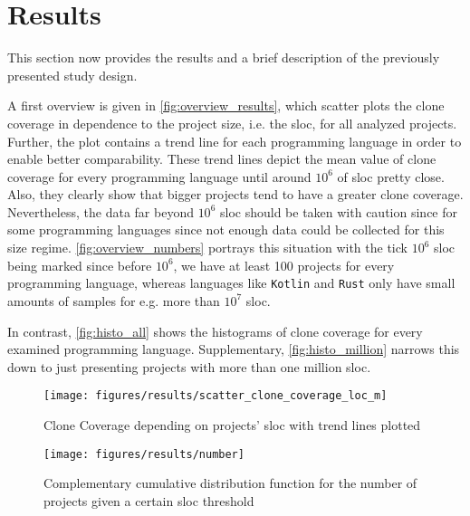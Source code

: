 
\section{Results}
\label{sec:results}

This section now provides the results and a brief description of the previously presented study design. 


A first overview is given in \autoref{fig:overview_results}, which scatter plots the clone coverage in dependence to the project size, i.e. the \acl{sloc}, for all analyzed projects. Further, the plot contains a trend line for each programming language in order to enable better comparability. These trend lines depict the mean value of clone coverage for every programming language until around $10^6$ of \ac{sloc} pretty close. Also, they clearly show that bigger projects tend to have a greater clone coverage.
Nevertheless, the data far beyond $10^6$ \acl{sloc} should be taken with caution since for some programming languages since not enough data could be collected for this size regime. 
\autoref{fig:overview_numbers} portrays this situation with the tick $10^6$ \ac{sloc} being marked since before $10^6$, we have at least 100 projects for every programming language, whereas languages like \texttt{Kotlin} and \texttt{Rust} only have small amounts of samples for e.g. more than $10^7$ \ac{sloc}.


In contrast, \autoref{fig:histo_all} shows the histograms of clone coverage for every examined programming language. Supplementary, \autoref{fig:histo_million} narrows this down to just presenting projects with more than one million \acl{sloc}.

\begin{figure}[tbh!]
	\centering
	\texttt{[image: figures/results/scatter\_clone\_coverage\_loc\_m]}
	\caption{Clone Coverage depending on projects' \ac{sloc} with trend lines plotted}
	\label{fig:overview_results}
\end{figure}

\begin{figure}[tbh!]
	\centering
	\texttt{[image: figures/results/number]}
	\caption{Complementary cumulative distribution function for the number of projects given a certain \ac{sloc} threshold}
	\label{fig:overview_numbers}
\end{figure}

